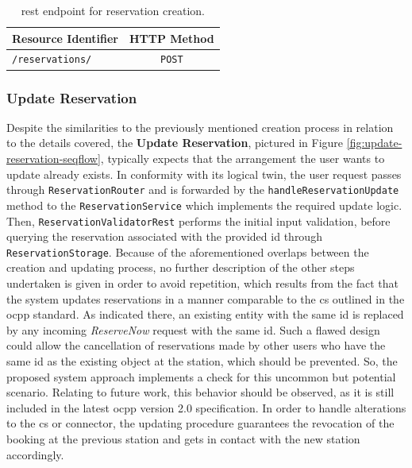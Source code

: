 \begingroup
\setlength{\tabcolsep}{10pt} %
\renewcommand{\arraystretch}{1.5} %
\begin{table}[h]
\centering
\caption{\acrshort{rest} endpoint for reservation creation.}
    \begin{tabular}{l|c}
    Resource Identifier & HTTP Method \\ \hline
    \texttt{/reservations/} & \texttt{POST} \\    
    \end{tabular}
\label{tab:create-reservation-rest}
\end{table}
\endgroup

\newpage

\subsubsection{Update Reservation}
\label{ch:Implementation:sec:Reservation System:ssec:Management Capabilities:sssec:Update Reservation}

Despite the similarities to the previously mentioned creation process in relation to the details covered, the \textbf{Update Reservation}, pictured in Figure \ref{fig:update-reservation-seqflow}, typically expects that the arrangement the user wants to update already exists.
In conformity with its logical twin, the user request passes through \texttt{ReservationRouter} and is forwarded by the \texttt{handleReservationUpdate} method to the \texttt{ReservationService} which implements the required update logic.
Then, \texttt{ReservationValidatorRest} performs the initial input validation, before querying the reservation associated with the provided \acrshort{id} through \\ \texttt{ReservationStorage}.
Because of the aforementioned overlaps between the creation and updating process, no further description of the other steps undertaken is given in order to avoid repetition, which results from the fact that the system updates reservations in a manner comparable to the \acrshort{cs} outlined in the \acrshort{ocpp} standard.
As indicated there, an existing entity with the same \acrshort{id} is replaced by any incoming \textit{ReserveNow} request with the same \acrshort{id}.  
Such a flawed design could allow the cancellation of reservations made by other users who have the same \acrshort{id} as the existing object at the station, which should be prevented. So, the proposed system approach implements a check for this uncommon but potential scenario.
Relating to future work, this behavior should be observed, as it is still included in the latest \acrshort{ocpp} version 2.0 specification.
In order to handle alterations to the \acrshort{cs} or connector, the updating procedure guarantees the revocation of the booking at the previous station and gets in contact with the new station accordingly.

